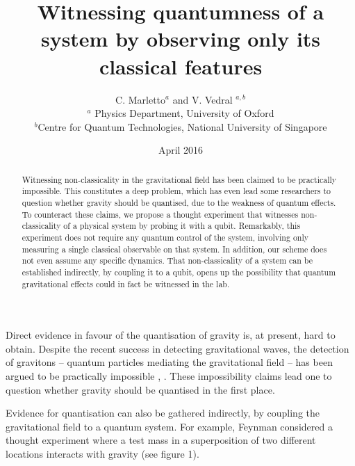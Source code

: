 \documentclass[prl,twocolumn,showpacs,preprintnumbers,amsmath,amssymb]{revtex4}
\begin{document}
	


\title{Witnessing quantumness of a system by observing only its classical features} 

\author{C. Marletto$^{a}$ and V. Vedral $^{a,b}$
	\\ {\small $^{a}$ Physics Department, University of Oxford} 
	\\{\small $^{b}$Centre for Quantum Technologies, National University of Singapore}}

\date{April 2016}

 

\begin{abstract}
	
\noindent Witnessing non-classicality in the gravitational field has been claimed to be practically impossible. This constitutes a deep problem, which has even lead some researchers to question whether gravity should be quantised, due to the weakness of quantum effects. To counteract these claims, we propose a thought experiment that witnesses non-classicality of a physical system by probing it with a qubit. Remarkably, this experiment does not require any quantum control of the system, involving only measuring a single classical observable on that system. In addition, our scheme does not even assume any specific dynamics. 
That non-classicality of a system can be established indirectly, by coupling it to a qubit, opens up the possibility that quantum gravitational effects could in fact be witnessed in the lab. 
\bigskip

\end{abstract}

\maketitle

Direct evidence in favour of the quantisation of gravity is, at present, hard to obtain. Despite the recent success in detecting gravitational waves, the detection of gravitons -- quantum particles mediating the gravitational field -- has been argued to be practically impossible \cite{NOB}, \cite{NOB1}. These impossibility claims lead one to question whether gravity should be quantised in the first place. 

Evidence for quantisation can also be gathered indirectly, by coupling the gravitational field to a quantum system. For example, Feynman \cite{FEY} considered a thought experiment where a test mass in a superposition of two different locations interacts with gravity (see figure 1). 
\end{document}
